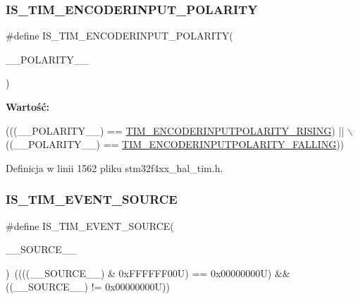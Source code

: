 \subsubsection{\texorpdfstring{I\+S\+\_\+\+T\+I\+M\+\_\+\+E\+N\+C\+O\+D\+E\+R\+I\+N\+P\+U\+T\+\_\+\+P\+O\+L\+A\+R\+I\+TY}{IS\_TIM\_ENCODERINPUT\_POLARITY}}
{\footnotesize\ttfamily \#define I\+S\+\_\+\+T\+I\+M\+\_\+\+E\+N\+C\+O\+D\+E\+R\+I\+N\+P\+U\+T\+\_\+\+P\+O\+L\+A\+R\+I\+TY(\begin{DoxyParamCaption}\item[{}]{\+\_\+\+\_\+\+P\+O\+L\+A\+R\+I\+T\+Y\+\_\+\+\_\+ }\end{DoxyParamCaption})}

{\bfseries Wartość\+:}
\begin{DoxyCode}
(((\_\_POLARITY\_\_) == \hyperlink{group___t_i_m___encoder___input___polarity_gac015dd6602fcaa8dec8208e773f5921c}{TIM\_ENCODERINPUTPOLARITY\_RISING})   || \(\backslash\)
                                                      ((\_\_POLARITY\_\_) == 
      \hyperlink{group___t_i_m___encoder___input___polarity_gaf0e5158977c8d2fab26ff6dcdbc84ae6}{TIM\_ENCODERINPUTPOLARITY\_FALLING}))
\end{DoxyCode}


Definicja w linii 1562 pliku stm32f4xx\+\_\+hal\+\_\+tim.\+h.

\mbox{\label{group___t_i_m___private___macros_gae4a44eb3977f1cba86a9179c8c7f6b36}} 
\subsubsection{\texorpdfstring{I\+S\+\_\+\+T\+I\+M\+\_\+\+E\+V\+E\+N\+T\+\_\+\+S\+O\+U\+R\+CE}{IS\_TIM\_EVENT\_SOURCE}}
{\footnotesize\ttfamily \#define I\+S\+\_\+\+T\+I\+M\+\_\+\+E\+V\+E\+N\+T\+\_\+\+S\+O\+U\+R\+CE(\begin{DoxyParamCaption}\item[{}]{\+\_\+\+\_\+\+S\+O\+U\+R\+C\+E\+\_\+\+\_\+ }\end{DoxyParamCaption})~((((\+\_\+\+\_\+\+S\+O\+U\+R\+C\+E\+\_\+\+\_\+) \& 0x\+F\+F\+F\+F\+F\+F00\+U) == 0x00000000\+U) \&\& ((\+\_\+\+\_\+\+S\+O\+U\+R\+C\+E\+\_\+\+\_\+) != 0x00000000\+U))}



